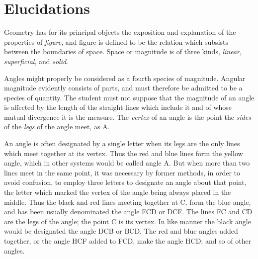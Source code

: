 \documentclass{byrne-book}
\begin{document}
\chapter*{Elucidations}

Geometry has for its principal objects the exposition and explanation of the properties of \emph{figure}, and figure is defined to be the relation which subsists between the boundaries of space. Space or magnitude is of three kinds, \emph{linear}, \emph{superficial}, and \emph{solid}.

\drawCurrentPictureInMargin
Angles might properly be considered as a fourth species of magnitude. Angular magnitude evidently consists of parts, and must therefore be admitted to be a species of quantity. The student must not suppose that the magnitude of an angle is affected by the length of the straight lines which include it and of whose mutual divergence it is the measure. The \emph{vertex} of an angle is the point the \emph{sides} of the \emph{legs} of the angle meet, as A.

\drawCurrentPictureInMargin
An angle is often designated by a single letter when its legs are the only lines which meet together at its vertex. Thus the red and blue lines form the yellow angle, which in other systems would be called angle A. But when more than two lines meet in the same point, it was necessary by former methods, in order to avoid confusion, to employ three letters to designate an angle about that point, the letter which marked the vertex of the angle being always placed in the middle. Thus the black and red lines meeting together at C, form the blue angle, and has been usually denominated the angle FCD or DCF. The lines FC and CD are the legs of the angle; the point C is its vertex. In like manner the black angle would be designated the angle DCB or BCD. The red and blue angles added together, or the angle HCF added to FCD, make the angle HCD; and so of other angles.
\end{document}
